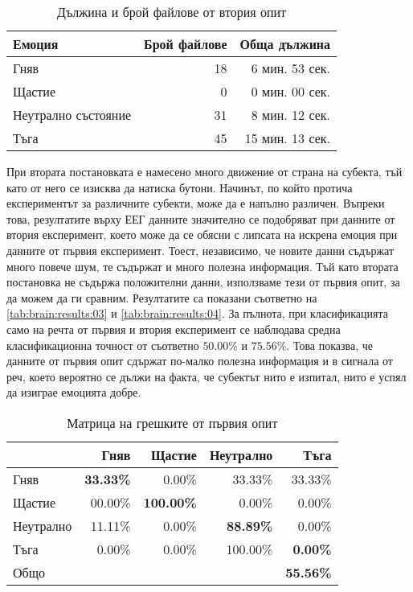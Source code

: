 \documentclass[main.tex]{subfiles}
\begin{document}
\begin{table}[h]
    \begin{center}
    \begin{tabular}{|l|r|r|} 
        \hline
        Емоция & Брой файлове & Обща дължина\\ 
        \hline
        Гняв & 18 & 6 мин. 53 сек.\\ 
        Щастие & 0 & 0 мин. 00 сек. \\ 
        Неутрално състояние & 31 & 8 мин. 12 сек. \\ 
        Тъга & 45 & 15 мин. 13 сек. \\ 
        \hline
    \end{tabular}
    \caption{Дължина и брой файлове от втория опит}
    \label{tab:brain:results:02}
    \end{center}
\end{table}

При втората постановката е намесено много движение от страна на субекта, тъй като от него се изисква да натиска бутони. Начинът, по който протича експериментът за различните субекти, може да е напълно различен. Въпреки това, резултатите върху ЕЕГ данните значително се подобряват при данните от втория експеримент, което може да се обясни с липсата на искрена емоция при данните от първия експеримент. Тоест, независимо, че новите данни съдържат много повече шум, те съдържат и много полезна информация. 
Тъй като втората постановка не съдържа положителни данни, използваме тези от първия опит, за да можем да ги сравним. Резултатите са показани съответно на \autoref{tab:brain:results:03} и \autoref{tab:brain:results:04}. За пълнота, при класификацията само на речта от първия и втория експеримент се наблюдава средна класификационна точност от съответно $50.00\%$ и $75.56\%$. Това показва, че данните от първия опит сдържат по-малко полезна информация и в сигнала от реч, което вероятно се дължи на факта, че субектът нито е изпитал, нито е успял да изиграе емоцията добре.


\begin{table}[h]
    \begin{center}
    \begin{tabular}{|l|r r r r|} 
        \hline
        & Гняв & Щастие & Неутрално & Тъга \\ 
        \hline
        Гняв &  \textbf{33.33\%} & 0.00\% & 33.33\% & 33.33\% \\ 
        Щастие & 00.00\% & \textbf{100.00\%} & 0.00\% & 0.00\% \\ 
        Неутрално & 11.11\% & 0.00\% & \textbf{88.89\%} & 0.00\% \\ 
        Тъга & 0.00\% & 0.00\% & 100.00\% & \textbf{0.00\%}\\ 
        \hline
        \hline
        Общо & & & & \textbf{55.56\%}\\
        \hline
    \end{tabular}
    \caption{Матрица на грешките от първия опит}
    \label{tab:brain:results:03}
    \end{center}
\end{table}
\end{document}
